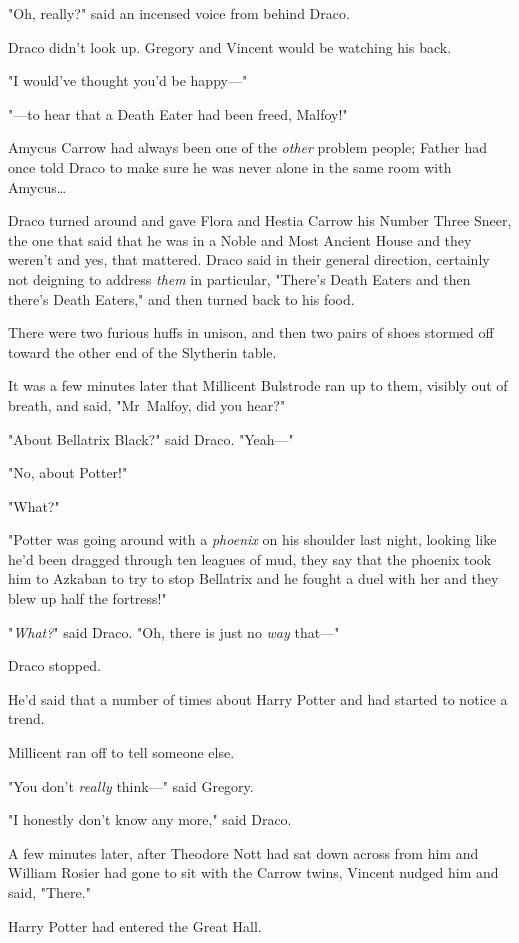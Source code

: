 "Oh, really?" said an incensed voice from behind Draco.

Draco didn't look up. Gregory and Vincent would be watching his back.

"I would've thought you'd be happy—"

"—to hear that a Death Eater had been freed, Malfoy!"

Amycus Carrow had always been one of the \emph{other} problem people; Father
had once told Draco to make sure he was never alone in the same room with
Amycus…

Draco turned around and gave Flora and Hestia Carrow his Number Three Sneer,
the one that said that he was in a Noble and Most Ancient House and they
weren't and yes, that mattered. Draco said in their general direction,
certainly not deigning to address \emph{them} in particular, "There's Death
Eaters and then there's Death Eaters," and then turned back to his food.

There were two furious huffs in unison, and then two pairs of shoes stormed off
toward the other end of the Slytherin table.

It was a few minutes later that Millicent Bulstrode ran up to them, visibly out
of breath, and said, "Mr~Malfoy, did you hear?"

"About Bellatrix Black?" said Draco. "Yeah—"

"No, about Potter!"

"What?"

"Potter was going around with a \emph{phoenix} on his shoulder last night,
looking like he'd been dragged through ten leagues of mud, they say that the
phoenix took him to Azkaban to try to stop Bellatrix and he fought a duel with
her and they blew up half the fortress!"

"\emph{What?}" said Draco. "Oh, there is just no \emph{way} that—"

Draco stopped.

He'd said that a number of times about Harry Potter and had started to notice a
trend.

Millicent ran off to tell someone else.

"You don't \emph{really} think—" said Gregory.

"I honestly don't know any more," said Draco.

A few minutes later, after Theodore Nott had sat down across from him and
William Rosier had gone to sit with the Carrow twins, Vincent nudged him and
said, "There."

Harry Potter had entered the Great Hall.

